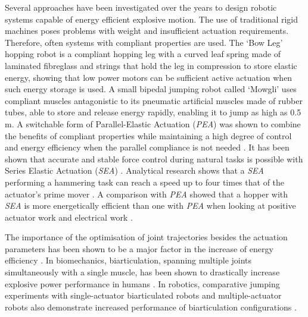 \documentclass[letterpaper, 10 pt, conference]{ieeeconf}  %
\begin{document}
	Several approaches have been investigated over the years to design robotic systems capable of energy efficient explosive motion. The use of traditional rigid machines poses problems with weight and insufficient actuation requirements. Therefore, often systems with compliant properties are used. The `Bow Leg' hopping robot \cite{zeglin1999bow} is a compliant hopping leg with a curved leaf spring made of laminated fibreglass and strings that hold the leg in compression to store elastic energy, showing that low power motors can be sufficient active actuation when such energy storage is used. A small bipedal jumping robot called `Mowgli' \cite{niiyama2007mowgli} uses compliant muscles antagonistic to its pneumatic artificial muscles made of rubber tubes, able to store and release energy rapidly, enabling it to jump as high as 0.5\,m. A switchable form of Parallel-Elastic Actuation (\textit{PEA}) was shown to combine the benefits of compliant properties while maintaining a high degree of control and energy efficiency when the parallel compliance is not needed \cite{liu2015spear}. It has been shown that accurate and stable force control during natural tasks is possible with Series Elastic Actuation (\textit{SEA}) \cite{pratt1995series}. Analytical research shows that a \textit{SEA} performing a hammering task can reach a speed up to four times that of the actuator’s prime mover \cite{garabini2011optimality}. A comparison with \textit{PEA} showed that a hopper with \textit{SEA} is more energetically efficient than one with \textit{PEA} when looking at positive actuator work and electrical work \cite{yesilevskiy2015comparison}.
	
	The importance of the optimisation of joint trajectories besides the actuation parameters has been shown to be a major factor in the increase of energy efficiency \cite{velasco2013soft}. In biomechanics, biarticulation, spanning multiple joints simultaneously with a single muscle, has been shown to drastically increase explosive power performance in humans \cite{schenau1989rotation,prilutsky1994tendon}. In robotics, comparative jumping experiments with single-actuator biarticulated robots and multiple-actuator robots also demonstrate increased performance of biarticulation configurations \cite{oshima2007jumping,babivc2009biarticulated,hyon2002development}.
	
\end{document}
